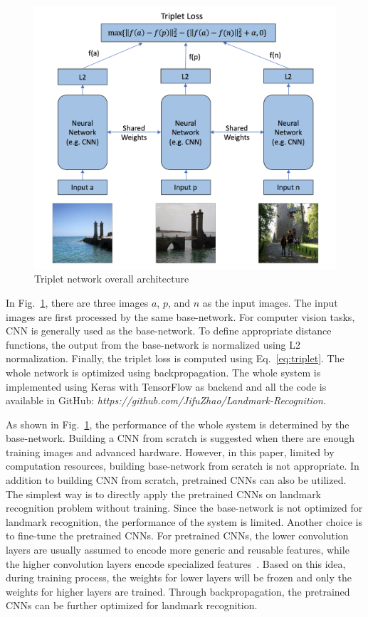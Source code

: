 \documentclass[final,3p]{elsarticle}
\begin{document}
\begin{figure}[h]
\centering\includegraphics[width=0.85\linewidth]{./figures/triplet.png}
\caption{Triplet network overall architecture}
\label{fig:network}
\end{figure}

In Fig.~\ref{fig:network}, there are three images $a$, $p$, and $n$ as the input images. The input images are first processed by the same base-network. For computer vision tasks, CNN is generally used as the base-network. To define appropriate distance functions, the output from the base-network is normalized using L2 normalization. Finally, the triplet loss is computed using Eq.~\ref{eq:triplet}. The whole network is optimized using backpropagation. The whole system is implemented using Keras with TensorFlow as backend and all the code is available in GitHub: \textit{https://github.com/JifuZhao/Landmark-Recognition}.

As shown in Fig.~\ref{fig:network}, the performance of the whole system is determined by the base-network. Building a CNN from scratch is suggested when there are enough training images and advanced hardware. However, in this paper, limited by computation resources, building base-network from scratch is not appropriate. In addition to building CNN from scratch, pretrained CNNs can also be utilized. The simplest way is to directly apply the pretrained CNNs on landmark recognition problem without training. Since the base-network is not optimized for landmark recognition, the performance of the system is limited. Another choice is to fine-tune the pretrained CNNs. For pretrained CNNs, the lower convolution layers are usually assumed to encode more generic and reusable features, while the higher convolution layers encode specialized features~\cite{chollet2017deep}. Based on this idea, during training process, the weights for lower layers will be frozen and only the weights for higher layers are trained. Through backpropagation, the pretrained CNNs can be further optimized for landmark recognition.
\end{document}
